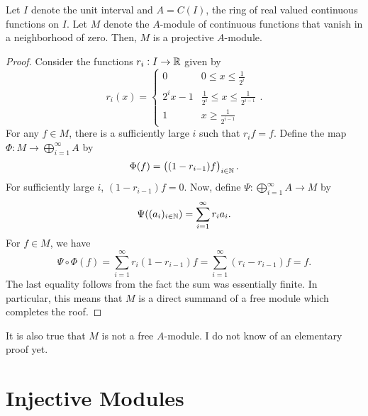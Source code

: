 \begin{theorem}
    Let $I$ denote the unit interval and $A = C(I)$, the ring of real valued continuous functions on $I$. Let $M$ denote the $A$-module of continuous functions that vanish in a neighborhood of zero. Then, $M$ is a projective $A$-module.
\end{theorem}
\begin{proof}
    Consider the functions $r_i: I\to\mathbb{R}$ given by 
    \begin{equation*}
        r_i(x) = 
        \begin{cases}
            0 & 0\le x\le\frac{1}{2^i}\\
            2^ix - 1 & \frac{1}{2^{i}}\le x\le\frac{1}{2^{i - 1}}\\
            1 & x\ge\frac{1}{2^{i - 1}}
        \end{cases}.
    \end{equation*}
    For any $f\in M$, there is a sufficiently large $i$ such that $r_i f = f$. Define the map $\Phi: M\to\bigoplus_{i = 1}^\infty A$ by 
    \begin{equation*}
        \Phi(f) = \left((1 - r_{i - 1})f\right)_{i\in\mathbb{N}}.
    \end{equation*}
    For sufficiently large $i$, $(1 - r_{i - 1})f = 0$. Now, define $\Psi:\bigoplus_{i = 1}^\infty A\to M$ by 
    \begin{equation*}
        \Psi((a_i)_{i\in\mathbb{N}}) = \sum_{i = 1}^\infty r_ia_i.
    \end{equation*}
    For $f\in M$, we have 
    \begin{equation*}
        \Psi\circ\Phi(f) = \sum_{i = 1}^\infty r_i(1 - r_{i - 1})f = \sum_{i = 1}^\infty (r_i - r_{i - 1})f = f.
    \end{equation*}
    The last equality follows from the fact the sum was essentially finite. In particular, this means that $M$ is a direct summand of a free module which completes the roof.
\end{proof}

\begin{remark}
    It is also true that $M$ is not a free $A$-module. I do not know of an elementary proof yet.
\end{remark}

\section{Injective Modules}

